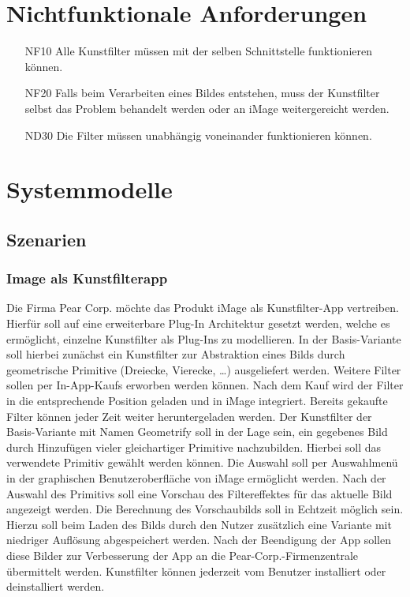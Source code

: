 \documentclass[parskip=full]{scrartcl}
\begin{document}
\section{Nichtfunktionale Anforderungen}
\begin{itemize}[nosep]
\item[NF10] Alle Kunstfilter müssen mit der selben \gls{Schnittstelle} funktionieren können.
\item[NF20] Falls beim Verarbeiten eines Bildes entstehen, muss der Kunstfilter selbst das Problem behandelt werden oder an iMage weitergereicht werden.
\item[ND30] Die Filter müssen unabhängig voneinander funktionieren können.
\end{itemize}

\section{Systemmodelle}

\subsection{Szenarien}
\subsubsection{Image als Kunstfilterapp}
%
%
Die Firma Pear Corp. möchte das Produkt iMage als Kunstfilter-App vertreiben. Hierfür soll auf eine erweiterbare \gls{Plug-In} Architektur gesetzt werden, welche es ermöglicht, einzelne Kunstfilter als Plug-Ins zu modellieren. In der Basis-Variante soll hierbei zunächst ein Kunstfilter zur Abstraktion eines Bilds durch geometrische Primitive (Dreiecke, Vierecke, …) ausgeliefert werden. Weitere Filter sollen per \glspl{In-App-Kauf} erworben werden können. Nach dem Kauf wird der Filter in die entsprechende Position geladen und in iMage integriert. Bereits gekaufte Filter können jeder Zeit weiter heruntergeladen werden.
Der Kunstfilter der Basis-Variante mit Namen Geometrify soll in der Lage sein, ein gegebenes Bild durch Hinzufügen vieler gleichartiger Primitive nachzubilden. Hierbei soll das verwendete Primitiv gewählt werden können.
Die Auswahl soll per Auswahlmenü in der graphischen Benutzeroberfläche von iMage ermöglicht werden. Nach der Auswahl des Primitivs soll eine Vorschau des Filtereffektes für das aktuelle Bild angezeigt werden. Die Berechnung des Vorschaubilds soll in Echtzeit möglich sein. Hierzu soll beim Laden des Bilds durch den Nutzer zusätzlich eine Variante mit niedriger Auflösung abgespeichert werden. Nach der Beendigung der App sollen diese Bilder zur Verbesserung der App an die Pear-Corp.-Firmenzentrale übermittelt werden.
Kunstfilter können jederzeit vom Benutzer installiert oder deinstalliert werden.
\end{document}
